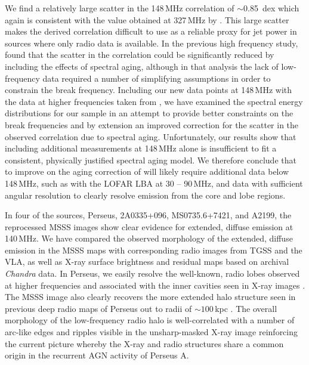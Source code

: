 \documentclass{aa}  %
\begin{document}
We find a relatively large scatter in the 148\,MHz correlation of $\sim$0.85~dex which again is consistent with the value obtained at 327\,MHz by \cite{Birzan2008}. This large scatter makes the derived correlation difficult to use as a reliable proxy for jet power in sources where only radio data is available. In the previous high frequency study, \cite{Birzan2008} found that the scatter in the correlation could be significantly reduced by including the effects of spectral aging, although in that analysis the lack of low-frequency data required a number of simplifying assumptions in order to constrain the break frequency. Including our new data points at 148\,MHz with the data at higher frequencies taken from \cite{Birzan2008}, we have examined the spectral energy distributions for our sample in an attempt to provide better constraints on the break frequencies and by extension an improved correction for the scatter in the observed correlation due to spectral aging. Unfortunately, our results show that including additional measurements at 148\,MHz alone is insufficient to fit a consistent, physically justified spectral aging model. We therefore conclude that to improve on the aging correction of \cite{Birzan2008} will likely require additional data below 148\,MHz, such as with the LOFAR LBA at 30 -- 90\,MHz, and data with sufficient angular resolution to clearly resolve emission from the core and lobe regions. 

In four of the sources, Perseus, 2A0335+096, MS0735.6+7421, and A2199, the reprocessed MSSS images show clear evidence for extended, diffuse emission at 140\,MHz. We have compared the observed morphology of the extended, diffuse emission in the MSSS maps with corresponding radio images from TGSS and the VLA, as well as X-ray surface brightness and residual maps based on archival \textit{Chandra} data. In Perseus, we easily resolve the well-known, radio lobes observed at higher frequencies \citep{Pedlar1990} and associated with the inner cavities seen in X-ray images \citep{Fabian2000,Fabian2006}. The MSSS image also clearly recovers the more extended halo structure seen in previous deep radio maps of Perseus out to radii of $\sim100$\,kpc \citep{Burns1992, Sijbring1993, DeBruyn2005}. The overall morphology of the low-frequency radio halo is well-correlated with a number of arc-like edges and ripples visible in the unsharp-masked X-ray image \citep{Fabian2006} reinforcing the current picture whereby the X-ray and radio structures share a common origin in the recurrent AGN activity of Perseus A.
\end{document}
